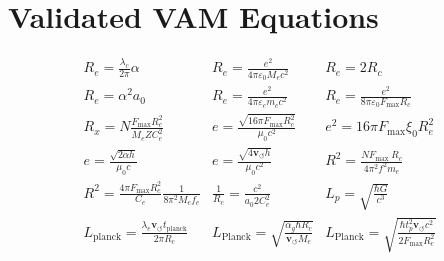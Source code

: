     \section*{Validated VAM Equations}\label{sec:validated-vam-equations}
    \begin{equation*}
        \begin{array}{ccc}
            R_e = \frac{\lambda_c}{2 \pi} \alpha & R_e = \frac{e^2}{4 \pi \varepsilon_0 M_e c^2} & R_e = 2 R_c \\
            R_e = \alpha^2 a_0 & R_e = \frac{e^2}{4 \pi \varepsilon_c m_c c^2} & R_e = \frac{e^2}{8 \pi \varepsilon_0 F_{\max} R_c} \\
            R_x = N \frac{F_{\max} R_c^2}{M_e Z C_e^2} & e = \frac{\sqrt{16 \pi F_{\max} R_c^2}}{\mu_0 c^2} & e^2 = 16 \pi F_{\max} \xi_0 R_e^2 \\
            e = \frac{\sqrt{2 \alpha h}}{\mu_0 c} & e = \frac{\sqrt{4 \mathbf{v}_{\scriptscriptstyle\boldsymbol{\circlearrowleft}} h}}{\mu_0 c^2} & R^2 = \frac{N F_{\text {max }} R_c}{4 \pi^2 f^2 m_e} \\
            R^2 = \frac{4 \pi F_{\max} R_c^2}{C_e} \frac{1}{8 \pi^2 M_e f_e} & \frac{1}{R_c} = \frac{c^2}{a_0 2 C_e^2} & {L_p} = \sqrt{\frac{\hbar G}{c^3}} \\
            L_{\mathrm{planck}} = \frac{\lambda_e \mathbf{v}_{\scriptscriptstyle\boldsymbol{\circlearrowleft}} t_{\mathrm{planck}}}{2 \pi R_c} & L_\text{Planck} = \sqrt{\frac{\alpha_g \hbar R_c}{\mathbf{v}_{\scriptscriptstyle\boldsymbol{\circlearrowleft}} M_e}} & L_\text{Planck} = \sqrt{\frac{\hbar t_p^2 \mathbf{v}_{\scriptscriptstyle\boldsymbol{\circlearrowleft}} c^2}{2 F_{\max} R_c^2}} \\
        \end{array}
    \end{equation*}

